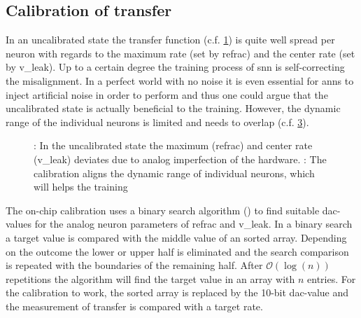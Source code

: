 \subsection{Calibration of \gls{transfer}}\label{calibration}
In an uncalibrated state the transfer function (c.f. \cref{transferfunction_wout_calib}) is quite well spread per neuron with regards to the maximum rate (set by \gls{refrac}) and the center rate (set by \gls{v_leak}). Up to a certain degree the training process of \gls{snn} is self-correcting the misalignment. In a perfect world with no noise it is even essential for \glspl{ann} to inject artificial noise in order to perform and thus one could argue that the uncalibrated state is actually beneficial to the training. However, the dynamic range of the individual neurons is limited and needs to overlap (c.f. \cref{transferfunction_w_calib}).

\begin{figure}
	\centering
	\begin{subfigure}[b]{0.47\textwidth}
	\caption{}
	
	\label{transferfunction_wout_calib}
	\end{subfigure}
	\begin{subfigure}[b]{0.47\textwidth}		
	\caption{}
	
	\label{transferfunction_w_calib}
	\end{subfigure}
	\caption{: In the uncalibrated state the maximum (\gls{refrac}) and center rate (\gls{v_leak}) deviates due to analog imperfection of the hardware. : The calibration aligns the dynamic range of individual neurons, which will helps the training}
\end{figure}

The on-chip calibration uses a binary search algorithm (\cite{binarysearchsource}) to find suitable \gls{dac}-values for the analog neuron parameters of \gls{refrac} and \gls{v_leak}. In a binary search a target value is compared with the middle value of an sorted array. Depending on the outcome the lower or upper half is eliminated and the search comparison is repeated with the boundaries of the remaining half. After $\mathcal{O}(\log(n))$ repetitions the algorithm will find the target value in an array with $n$ entries. For the calibration to work, the sorted array is replaced by the 10-bit \gls{dac}-value and the measurement of \gls{transfer} is compared with a target rate.


